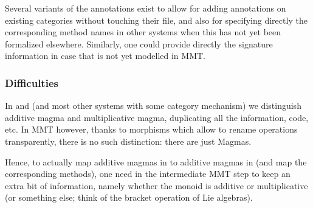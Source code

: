 Several variants of the annotations exist to allow for adding
annotations on existing categories without touching their file, and also
for specifying directly the corresponding method names in other systems
when this has not yet been formalized elsewhere. Similarly, one could
provide directly the signature information in case that is not yet
modelled in MMT.

\subsubsection{Difficulties}\label{difficulties}

In \Sage and \GAP (and most other systems with some category mechanism) we distinguish
additive magma and multiplicative magma, duplicating all the information, code, etc. In
MMT however, thanks to morphisms which allow to rename operations transparently, there is
no such distinction: there are just Magmas.

Hence, to actually map additive magmas in \Sage to additive magmas in \GAP (and map the
corresponding methods), one need in the intermediate MMT step to keep an extra bit of
information, namely whether the monoid is additive or multiplicative (or something else;
think of the bracket operation of Lie algebras).


